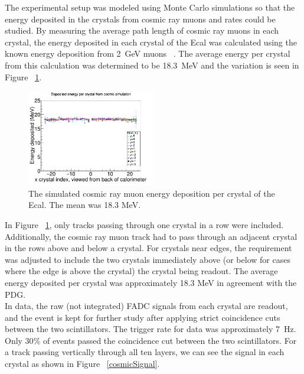 \documentclass[twoside]{article}
\begin{document}
\begin{multicols}{2}
The experimental setup was modeled using Monte Carlo simulations so that the energy deposited in the crystals from cosmic ray muons and rates could be studied. By measuring the average path length of cosmic ray muons in each crystal, the energy deposited in each crystal of the Ecal was calculated using the known energy deposition from 2~GeV muons ~\cite{pdg}. The average energy per crystal from this calculation was determined to be 18.3~MeV and the variation is seen in Figure ~\ref{cosmicEdep}.

\begin{figure}[H]
  \centering
      \includegraphics[width=0.5\textwidth]{pics/cosmicEdep.png}
  \caption{The simulated cosmic ray muon energy deposition per crystal of the Ecal. The mean was 18.3 MeV.}
  \label{cosmicEdep}
\end{figure}

In Figure ~\ref{cosmicEdep}, only tracks passing through one crystal in a row were included. Additionally, the cosmic ray muon track had to pass through an adjacent crystal in the rows above and below a crystal. For crystals near edges, the requirement was adjusted to include the two crystals immediately above (or below for cases where the edge is above the crystal) the crystal being readout. The average energy deposited per crystal was approximately 18.3 MeV in agreement with the PDG. \\
\indent In data, the raw (not integrated) FADC signals from each crystal are readout, and the event is kept for further study after applying strict coincidence cuts between the two scintillators. The trigger rate for data was approximately 7~Hz. Only 30$\%$ of events passed the coincidence cut between the two scintillators. For a track passing vertically through all ten layers, we can see the signal in each crystal as shown in Figure ~\ref{cosmicSignal}.


\end{multicols}
\end{document}
